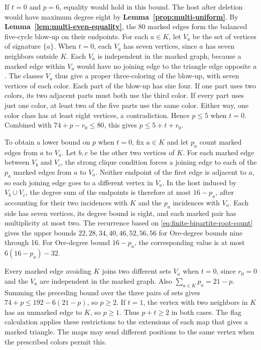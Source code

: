 \documentclass[preprint,11pt,numbers]{elsarticle-arxiv}
\numberwithin{equation}{section}
\theoremstyle{definition}
\begin{document}
If $t=0$ and $p=6$, equality would hold in this bound.
The host after deletion would have maximum degree eight by
\textbf{Lemma~\ref{prop:multi-uniform}}.
By \textbf{Lemma~\ref{lem:multi-even-equality}}, the 80 marked
edges form the balanced five-cycle blow-up on their endpoints.
For each $a\in K$, let $V_a$ be the set of vertices of signature
$\{a\}$. When $t=0$, each $V_a$ has seven vertices, since $a$
has seven neighbors outside $K$. Each $V_a$ is independent in
the marked graph, because a marked edge within $V_a$ would have no
joining edge to the triangle edge opposite $a$. The classes $V_a$
thus give a proper three-coloring of the blow-up, with seven
vertices of each color. Each part of the blow-up has size four.
If one part uses two colors, its two adjacent parts must both use
the third color. If every part uses just one color, at least two of
the five parts use the same color. Either way, one color class has
at least eight vertices, a contradiction. Hence $p\leq5$ when $t=0$.
Combined with $74+p-r_0\leq80$, this gives $p\leq5+t+r_0$.

To obtain a lower bound on $p$ when $t=0$, fix $a\in K$ and let
$p_a$ count marked edges from $a$ to $V_a$. Let $b,c$ be the other
two vertices of $K$. For each marked edge between $V_b$ and $V_c$,
the strong clique condition forces a joining edge to each of the
$p_a$ marked edges from $a$ to $V_a$. Neither endpoint of the first
edge is adjacent to $a$, so each joining edge goes to a different
vertex in $V_a$. In the host induced by $V_b\cup V_c$, the degree
sum of the endpoints is therefore at most $16-p_a$, after accounting
for their two incidences with $K$ and the $p_a$ incidences with
$V_a$. Each side has seven vertices, its degree bound is eight,
and each marked pair has multiplicity at most two. The recurrence
based on \eqref{eq:finite-bipartite-root-count} gives the upper
bounds $22,28,34,40,46,52,56,56$ for Ore-degree bounds nine through
16. For Ore-degree bound $16-p_a$, the corresponding value is at
most $6(16-p_a)-32$.

Every marked edge avoiding $K$ joins two different sets $V_a$
when $t=0$, since $r_0=0$ and the $V_a$ are independent in the
marked graph. Also $\sum_{a\in K}p_a=21-p$. Summing the preceding
bound over the three pairs of sets gives $74+p\leq192-6(21-p)$,
so $p\geq2$. If $t=1$, the vertex with two neighbors in $K$ has
an unmarked edge to $K$, so $p\geq1$. Thus $p+t\geq2$ in both
cases. The flag calculation applies these restrictions to the
extensions of each map that gives a marked triangle. The maps may
send different positions to the same vertex when the prescribed
colors permit this.
\relax\space%
\end{document}
